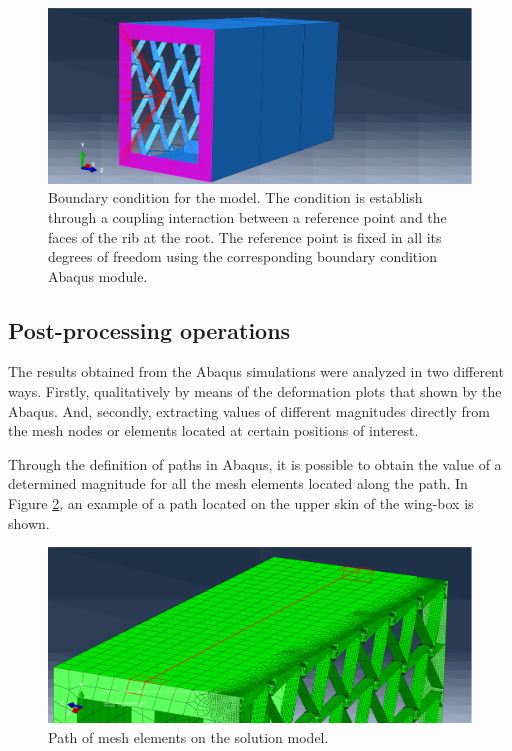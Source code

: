     \begin{figure}[!htpb]
      \centering
      \includegraphics[width=0.8 \textwidth]{../figures/result-model/fixed}
      \caption[Boundary condition for the model]{Boundary condition for the model. The condition is establish through a coupling interaction between a reference point and the faces of the rib at the root. The reference point is fixed in all its degrees of freedom using the corresponding boundary condition Abaqus module.}\label{fig:fixed}
    \end{figure}

  \clearpage
  \subsection{Post-processing operations} \label{subsec:postProc_computationalModel} %

    The results obtained from the Abaqus simulations were analyzed in two different ways. Firstly, qualitatively by means of the deformation plots that shown by the Abaqus. And, secondly, extracting values of different magnitudes directly from the mesh nodes or elements located at certain positions of interest.

    Through the definition of paths in Abaqus, it is possible to obtain the value of a determined magnitude for all the mesh elements located along the path. In Figure \ref{fig:pathUpper}, an example of a path located on the upper skin of the wing-box is shown.

    \begin{figure}[!htpb]
      \centering
      \includegraphics[width=0.8 \textwidth]{../figures/result-model/pathUpper}
      \caption[Path of mesh elements on the solution model]{Path of mesh elements on the solution model.}\label{fig:pathUpper}
    \end{figure}

